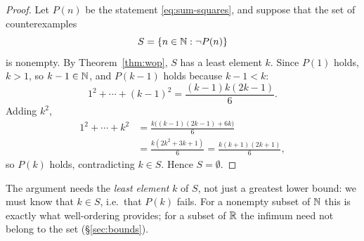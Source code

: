 \begin{proof}
    Let $P(n)$ be the statement \eqref{eq:sum-squares}, and suppose that
    the set of counterexamples
    \begin{equation*}
        S=\left\{n \in \mathbb{N} : \neg P(n)\right\}
    \end{equation*}
    is nonempty. By
    Theorem~\ref{thm:wop}, $S$ has a least element $k$. Since $P(1)$ holds,
    $k>1$, so $k-1\in\mathbb{N}$, and $P(k-1)$ holds because $k-1<k$:
    \begin{equation*}
        1^2 + \cdots + (k - 1)^2 = \frac{(k - 1)k(2k - 1)}{6}.
    \end{equation*}
    Adding $k^2$,
    \begin{align*}
        1^2 + \cdots + k^2
        &= \frac{k\bigl((k-1)(2k-1)+6k\bigr)}{6} \\
        &= \frac{k(2k^2+3k+1)}{6}
         = \frac{k(k+1)(2k+1)}{6},
    \end{align*}
    so $P(k)$ holds, contradicting $k\in S$. Hence $S=\emptyset$.
\end{proof}

\begin{remark}
    The argument needs the \emph{least element} $k$ of $S$, not just a
    greatest lower bound: we must know that $k\in S$, i.e.\ that $P(k)$
    fails. For a nonempty subset of $\mathbb{N}$ this is exactly what
    well-ordering provides; for a subset of $\mathbb{R}$ the infimum need not belong
    to the set (\S\ref{sec:bounds}).
\end{remark}
